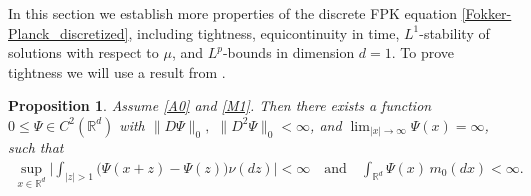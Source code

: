 \documentclass[a4paper,  twoside, 10pt, leqno]{amsart}
\newcommand{\rd}{\mathbb{R}^d}
\newtheorem{proposition}[thm]{Proposition}
\theoremstyle{remark}
\theoremstyle{definition}
\begin{document}
In this section we establish more properties of the discrete FPK equation \eqref{Fokker-Planck_discretized}, including tightness, equicontinuity in time, $L^1$-stability of solutions with respect to $\mu$, and $L^p$-bounds in dimension $d=1$.
 To prove tightness we will use a result from \cite{Espen-Indra-Milosz-2020}.
\begin{proposition}  \label{prop:tail-control-function}
Assume \ref{A0} and \ref{M1}. Then there exists a function $0\leq \Psi \in C^{2}(\rd)$ with $\|D\Psi\|_{0},$ $\|D^2\Psi\|_{0} < \infty$, and  $\displaystyle \lim_{|x|\rightarrow \infty} \Psi(x) = \infty$, such that 
\begin{align}\label{eq:tail-control-function}
\sup_{x\in \rd}\Big|\int_{|z|>1} \big(\Psi(x+z) - \Psi(z) \big)\nu(dz)\Big| < \infty \quad \mbox{and} \quad \int_{\rd} \Psi(x) \, m_0(dx)<\infty.
\end{align}
\end{proposition}

\end{document}
